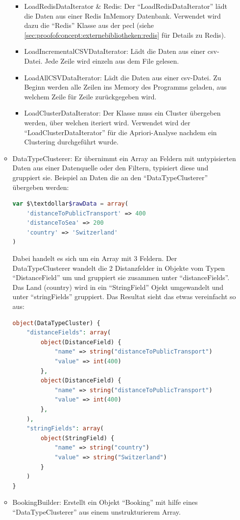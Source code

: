 \begin{itemize}
\begin{itemize}
				\begin{itemize}
					\item LoadRedisDataIterator \& Redis: Der "`LoadRedisDataIterator"' lädt die Daten aus einer Redis InMemory Datenbank. Verwendet wird dazu die "`Redis"' Klasse aus der \gls{pecl} (siehe \cref{sec:proofofconcept:externebibliotheken:redis}  für Details zu Redis).
					\item LoadIncrementalCSVDataIterator: Lädt die Daten aus einer \gls{csv}-Datei. Jede Zeile wird einzeln aus dem File gelesen.
					\item LoadAllCSVDataIterator: Lädt die Daten aus einer \gls{csv}-Datei. Zu Beginn werden alle Zeilen ins Memory des Programms geladen, aus welchem Zeile für Zeile zurückgegeben wird.
					\item LoadClusterDataIterator: Der Klasse muss ein Cluster übergeben werden, über welchen iteriert wird. Verwendet wird der "`LoadClusterDataIterator"' für die Apriori-Analyse nachdem ein Clustering durchgeführt wurde.
				\end{itemize}
			\item DataTypeClusterer: Er übernimmt ein Array an Feldern mit untypisierten Daten aus einer Datenquelle oder den Filtern, typisiert diese und gruppiert sie. Beispiel an Daten die an den "`DataTypeClusterer"' übergeben werden:
			\begin{lstlisting}[language=php]
var $\textdollar$rawData = array(
	'distanceToPublicTransport' => 400
	'distanceToSea' => 200
	'country' => 'Switzerland'
)
			\end{lstlisting}
			Dabei handelt es sich um ein Array mit 3 Feldern. Der DataTypeClusterer wandelt die 2 Distanzfelder in Objekte vom Typen "`DistanceField"' um und gruppiert sie zusammen unter "`distanceFields"'. Das Land (country) wird in ein "`StringField"' Ojekt umgewandelt und unter "`stringFields"' gruppiert. Das Resultat sieht das etwas vereinfacht so aus:
			\begin{lstlisting}[language=php]
object(DataTypeCluster) {
	"distanceFields": array(
		object(DistanceField) {
			"name" => string("distanceToPublicTransport")
			"value" => int(400)
		},
		object(DistanceField) {
			"name" => string("distanceToPublicTransport")
			"value" => int(400)
		},
	),
	"stringFields": array(
		object(StringField) {
			"name" => string("country")
			"value" => string("Switzerland")
		}
	)
}
			\end{lstlisting}
			\item BookingBuilder: Erstellt ein Objekt "`Booking"' mit hilfe eines "`DataTypeClusterer"' aus einem unstrukturierem Array.
		\end{itemize}
\end{itemize}

